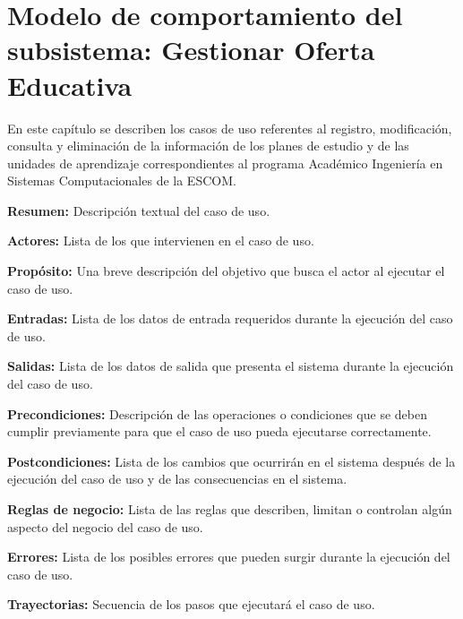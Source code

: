 
\chapter{Modelo de comportamiento del subsistema: Gestionar Oferta Educativa
\label{chp:gestionarAcademias}}

En este capítulo se describen los casos de uso referentes al registro, modificación, consulta y eliminación de la información de los planes de estudio y de las unidades de aprendizaje correspondientes al programa Académico Ingeniería en Sistemas Computacionales de la ESCOM. \bigskip

     \begin{objetivos}
	\item {\bf Resumen:} Descripción textual del caso de uso.
	\item {\bf Actores:} Lista de los 
	 que intervienen en el caso de uso.
	\item {\bf Propósito:} Una breve descripción del objetivo que busca el actor al ejecutar el caso de uso.
	\item {\bf Entradas:} Lista de los datos de entrada requeridos durante la ejecución del caso de uso.
	\item {\bf Salidas:} Lista de los datos de salida que presenta el sistema durante la ejecución del caso de uso.
	\item {\bf Precondiciones:} Descripción de las operaciones o condiciones que se deben cumplir previamente para que el caso de uso pueda ejecutarse correctamente.
	\item {\bf Postcondiciones:} Lista de los cambios que ocurrirán en el sistema después de la ejecución del caso de uso y de las consecuencias en el sistema.
	\item {\bf Reglas de negocio:} Lista de las reglas que describen, limitan o controlan algún aspecto del negocio del caso de uso.
	\item {\bf Errores:} Lista de los posibles errores que pueden surgir durante la ejecución del caso de uso.
	\item {\bf Trayectorias:} Secuencia de los pasos que ejecutará el caso de uso.
    \end{objetivos}

	
	

